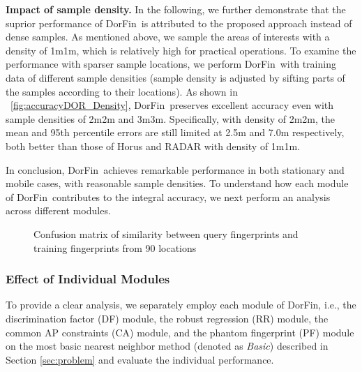 \documentclass[10pt,conference,compsocconf,letterpaper]{./sty/IEEEtran}
\def\4figwidth{0.23\textwidth}
\newcommand{\term}[1]{{\it #1}}
\newcommand{\empha}[1]{{\bf #1}}
\def\sysname{DorFin}
\begin{document}
\empha{Impact of sample density.} In the following, we further demonstrate that the suprior performance of \sysname~is attributed to the proposed approach instead of dense samples. 
As mentioned above, we sample the areas of interests with a density of 1m1m, which is relatively high for practical operations. To examine the performance with sparser sample locations, we perform \sysname~with training data of different sample densities (sample density is adjusted by sifting parts of the samples according to their locations). As shown in \figurename~\ref{fig:accuracyDOR_Density}, \sysname~preserves excellent accuracy even with sample densities of 2m2m and 3m3m. Specifically, with density of 2m2m, the mean and 95th percentile errors are still limited at 2.5m and 7.0m respectively, both better than those of Horus and RADAR with density of 1m1m.

In conclusion, \sysname~achieves remarkable performance in both stationary and mobile cases, with reasonable sample densities. To understand how each module of \sysname~contributes to the integral accuracy, we next perform an analysis across different modules.

\begin{figure*}[t]
	\centering
	\caption{Confusion matrix of similarity between query fingerprints and training fingerprints from 90 locations}
	\label{fig:confusionMatrix}
\end{figure*}

\subsubsection{Effect of Individual Modules}
To provide a clear analysis, we separately employ each module of \sysname, i.e., the discrimination factor (DF) module, the robust regression (RR) module, the common AP constraints (CA) module, and the phantom fingerprint (PF) module on the most basic nearest neighbor method (denoted as \term{Basic}) described in Section \ref{sec:problem} and evaluate the individual performance.
\end{document}
